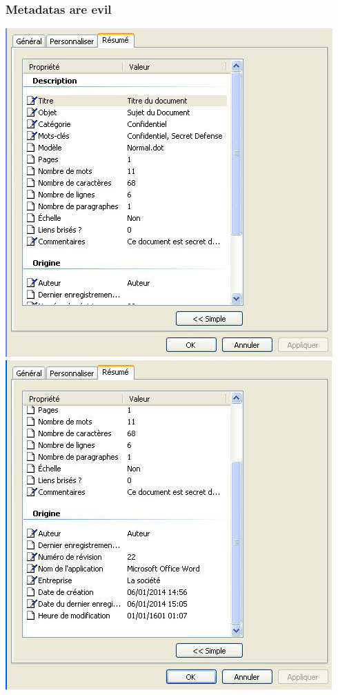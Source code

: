 \begin{frame}
\frametitle{Metadatas are evil}
\begin{center}
\includegraphics[scale=0.4] {./materials/Word01.jpg} 
\includegraphics[scale=0.4] {./materials/Word02.jpg} 
\end{center}
\end{frame}

